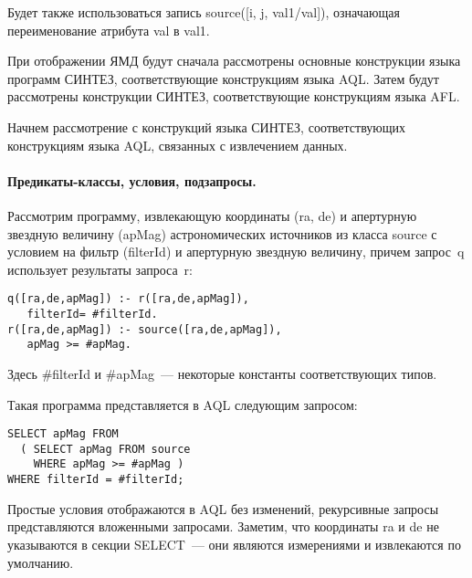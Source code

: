 \begin{multicols}{2}
        Будет также использоваться запись {\sf source([i, j, val1/val])}, означающая 
переименование атрибута {\sf val} в {\sf val1}.
        
        \medskip
        
        При отображении ЯМД будут сначала рассмотрены основные 
конструкции языка программ СИНТЕЗ, соответствующие конструкциям языка 
AQL. Затем будут рассмотрены конструкции \mbox{СИНТЕЗ}, соответствующие 
конструкциям языка AFL.
        
        Начнем рассмотрение с конструкций языка СИНТЕЗ, соответствующих 
конструкциям языка AQL, связанных с {извлечением} данных.
        
        
\paragraph*{Предикаты-классы, условия, подзапросы.} Рас\-смот\-рим 
программу, извлекающую координаты ({\sf ra}, {\sf de}) и апертурную звездную 
величину ({\sf apMag}) астрономических источников из класса  {\sf source} с 
условием на фильтр ({\sf filterId}) и апертурную звездную величину, причем 
запрос~{\sf q} использует результаты запроса~{\sf r}:
        \begin{verbatim}
q([ra,de,apMag]) :- r([ra,de,apMag]),
   filterId= #filterId.
r([ra,de,apMag]) :- source([ra,de,apMag]),
   apMag >= #apMag.
\end{verbatim}
Здесь {\sf \#filterId} и {\sf \#apMag}~--- некоторые константы 
соответствующих типов.
        
        Такая программа представляется в AQL сле\-ду\-ющим запросом:
        \begin{verbatim}
SELECT apMag FROM 
  ( SELECT apMag FROM source
    WHERE apMag >= #apMag )
WHERE filterId = #filterId;
\end{verbatim}
        
        Простые условия отображаются в AQL без изменений, рекурсивные 
запросы представляются вложенными запросами. Заметим, что координаты 
{\sf ra} и {\sf de} не указываются в секции {\sf SELECT}~--- они являются измерениями и 
извлекаются по умолчанию.
        

\end{multicols}

